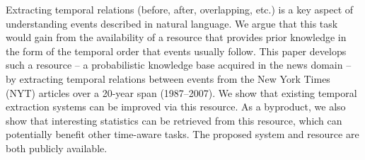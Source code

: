 Extracting temporal relations (before, after, overlapping, etc.) is a key aspect of understanding events described in natural language. We argue that this task would gain from the availability of a resource that provides prior knowledge in the form of the temporal order that events usually follow. This paper develops such a resource -- a probabilistic knowledge base acquired in the news domain -- by extracting temporal relations between events from the New York Times (NYT) articles over a 20-year span (1987--2007). We show that existing temporal extraction systems can be improved via this resource. As a byproduct, we also show that interesting statistics can be retrieved from this resource, which can potentially benefit other time-aware tasks. The proposed system and resource are both publicly available.
